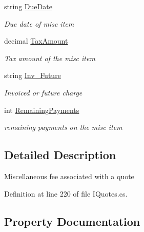 \begin{DoxyCompactItemize}
string \mbox{\hyperlink{class_g_f_s_c_1_1_services_1_1_end_of_term_1_1_misc_fee_a6a6cf8215958d439e93ab49cd0acc344}{Due\+Date}}
\begin{DoxyCompactList}\small\item\em Due date of misc item \end{DoxyCompactList}\item 
decimal \mbox{\hyperlink{class_g_f_s_c_1_1_services_1_1_end_of_term_1_1_misc_fee_a358389aa394ec87749f31750452fecb7}{Tax\+Amount}}
\begin{DoxyCompactList}\small\item\em Tax amount of the misc item \end{DoxyCompactList}\item 
string \mbox{\hyperlink{class_g_f_s_c_1_1_services_1_1_end_of_term_1_1_misc_fee_ace47d12f84e00daa492cc3776a29980f}{Inv\+\_\+\+Future}}
\begin{DoxyCompactList}\small\item\em Invoiced or future charge \end{DoxyCompactList}\item 
int \mbox{\hyperlink{class_g_f_s_c_1_1_services_1_1_end_of_term_1_1_misc_fee_a72d8363402c138d59cfc9f1be69dbc1d}{Remaining\+Payments}}
\begin{DoxyCompactList}\small\item\em remaining payments on the misc item \end{DoxyCompactList}\end{DoxyCompactItemize}


\subsection{Detailed Description}
Miscellaneous fee associated with a quote 



Definition at line 220 of file I\+Quotes.\+cs.



\subsection{Property Documentation}
\mbox{\label{class_g_f_s_c_1_1_services_1_1_end_of_term_1_1_misc_fee_af872fbc6877b7626f7114d32de62122a}} 
